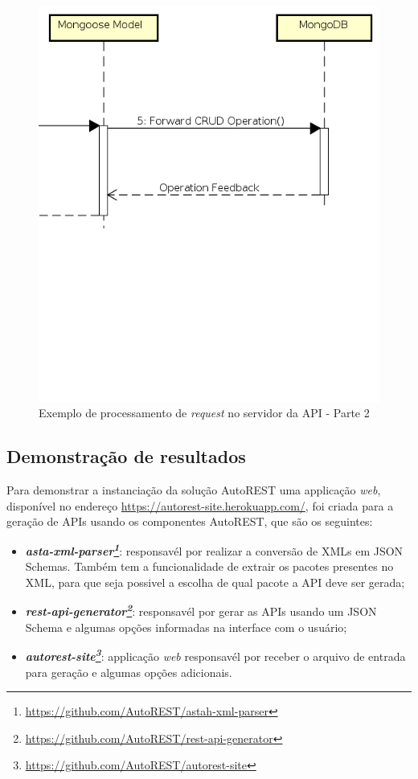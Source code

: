 \begin{figure}
    \begin{center}
        \includegraphics[scale=0.7]{imagens/API_Sequence_Diagram_2.png}
    \end{center}
	\caption{\label{fig:seq_api_2}Exemplo de processamento de \textit{request} no servidor da API - Parte 2}
\end{figure}

\subsection{Demonstração de resultados}
\label{sec:demo}

Para demonstrar a instanciação da solução AutoREST uma applicação \textit{web}, disponível no endereço \url{https://autorest-site.herokuapp.com/}, foi criada para a geração de APIs usando os componentes AutoREST, que são os seguintes:

\begin{itemize}
    \item \textit{\textbf{asta-xml-parser\footnote{\url{https://github.com/AutoREST/astah-xml-parser}}}}: responsavél por realizar a conversão de XMLs em JSON Schemas. Também tem a funcionalidade de extrair os pacotes presentes no XML, para que seja possivel a escolha de qual pacote a API deve ser gerada;
    \item \textit{\textbf{rest-api-generator\footnote{\url{https://github.com/AutoREST/rest-api-generator}}}}: responsavél por gerar as APIs usando um JSON Schema e algumas opções informadas na interface com o usuário;
    \item \textit{\textbf{autorest-site\footnote{\url{https://github.com/AutoREST/autorest-site}}}}: applicação \textit{web} responsavél por receber o arquivo de entrada para geração e algumas opções adicionais.
\end{itemize}


